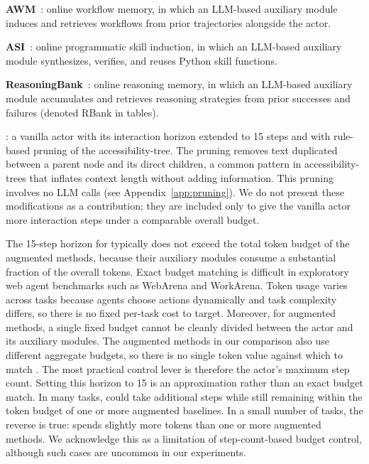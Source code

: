 \noindent\textbf{AWM}~\citep{wang-etal-2024-agent}: online workflow memory, in which an LLM-based auxiliary module induces and retrieves workflows from prior trajectories alongside the actor.

\noindent\textbf{ASI}~\citep{wang-etal-2025-asi}: online programmatic skill induction, in which an LLM-based auxiliary module synthesizes, verifies, and reuses Python skill functions.

\noindent\textbf{ReasoningBank}~\citep{ouyang-etal-2025-reasoningbank}: online reasoning memory, in which an LLM-based auxiliary module accumulates and retrieves reasoning strategies from prior successes and failures (denoted RBank in tables).

\noindent\textbf{\budgetactor{}}: a vanilla actor with its interaction horizon extended to 15 steps and with rule-based pruning of the accessibility-tree.
The pruning removes text duplicated between a parent node and its direct children, a common pattern in accessibility-trees that inflates context length without adding information.
This pruning involves no LLM calls (see Appendix~\ref{app:pruning}).
We do not present these modifications as a contribution; they are included only to give the vanilla actor more interaction steps under a comparable overall budget.

The 15-step horizon for \budgetactor{} typically does not exceed the total token budget of the augmented methods, because their auxiliary modules consume a substantial fraction of the overall tokens.
Exact budget matching is difficult in exploratory web agent benchmarks such as WebArena and WorkArena.
Token usage varies across tasks because agents choose actions dynamically and task complexity differs, so there is no fixed per-task cost to target.
Moreover, for augmented methods, a single fixed budget cannot be cleanly divided between the actor and its auxiliary modules.
The augmented methods in our comparison also use different aggregate budgets, so there is no single token value against which to match \budgetactor{}. The most practical control lever is therefore the actor's maximum step count.
Setting this horizon to 15 is an approximation rather than an exact budget match.
In many tasks, \budgetactor{} could take additional steps while still remaining within the token budget of one or more augmented baselines.
In a small number of tasks, the reverse is true: \budgetactor{} spends slightly more tokens than one or more augmented methods.
We acknowledge this as a limitation of step-count-based budget control, although such cases are uncommon in our experiments.

